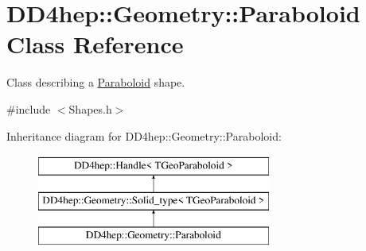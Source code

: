 \hypertarget{class_d_d4hep_1_1_geometry_1_1_paraboloid}{}\section{D\+D4hep\+:\+:Geometry\+:\+:Paraboloid Class Reference}
\label{class_d_d4hep_1_1_geometry_1_1_paraboloid}


Class describing a \hyperlink{class_d_d4hep_1_1_geometry_1_1_paraboloid}{Paraboloid} shape.  




{\ttfamily \#include $<$Shapes.\+h$>$}

Inheritance diagram for D\+D4hep\+:\+:Geometry\+:\+:Paraboloid\+:\begin{figure}[H]
\begin{center}
\leavevmode
\includegraphics[height=3.000000cm]{class_d_d4hep_1_1_geometry_1_1_paraboloid}
\end{center}
\end{figure}
